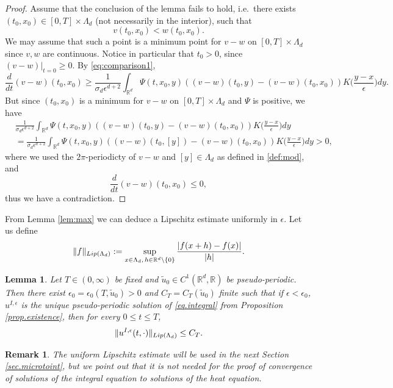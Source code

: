 \documentclass[a4paper,11pt]{amsart}
\newtheorem{lemma}[theorem]{Lemma}
\newtheorem{remark}[theorem]{Remark}
\newcommand{\red}[1]{{#1}}
\newcommand{\R}{\mathbb{R}}
\newcommand{\ep}{\epsilon}
\numberwithin{equation}{section}
\numberwithin{theorem}{section}
\theoremstyle{definition}
\begin{document}
\begin{proof}
Assume that the conclusion of the lemma fails to hold, i.e.~there exists $(t_0,x_0)\in[0,T]\times\Lambda_d$ (not necessarily in the interior), %
such that
\[
v(t_0,x_0)<w(t_0,x_0).
\]
We may assume that such a point is a minimum point for $v-w$ on $[0,T]\times\Lambda_d$ since $v,w$ are continuous. Notice in particular that $t_0>0$, since $(v-w)|_{t=0}\ge 0$. By \eqref{eq:comparison1},
\[
\frac{d}{dt}(v-w)(t_0,x_0)\geq \frac{1}{\sigma_d\ep^{d+2}}\int_{\R^d}\Psi(t, x_0, y)\left((v-w)(t_0,y)-(v-w)(t_0,x_0)\right) K\Big(\frac{y-x}{\ep}\Big)dy.
\]
But since $(t_0,x_0)$ is a minimum for $v-w$ on $[0,T]\times\Lambda_d$ and $\Psi$ is positive, we have
\begin{align*}
&\frac{1}{\sigma_d\ep^{d+2}}\int_{\R^d}\Psi(t, x_0, y)\left((v-w)(t_0,y)-(v-w)(t_0,x_0)\right) K\Big(\frac{y-x}{\ep}\Big)dy\\
&=\frac{1}{\sigma_d\ep^{d+2}}\int_{\R^d}\Psi(t, x_0, y)\left((v-w)(t_0,[y])-(v-w)(t_0,x_0)\right) K\Big(\frac{y-x}{\ep}\Big)dy> 0,
\end{align*}
\red{where we used the $2\pi$-periodicty of $v-w$ and $[y]\in\Lambda_d$ as defined in \eqref{def:mod}, }
and
\[
\frac{d}{dt}(v-w)(t_0,x_0)\le 0,
\]
thus we have a contradiction.
\end{proof}

From Lemma \ref{lem:max} we can deduce a Lipschitz estimate uniformly in $\ep$. Let us define
\[
\red{\|f\|_{\rm Lip(\Lambda_d)}:=\sup_{x\in\Lambda_d,\, h\in\R^d\backslash\{0\}}\frac{|f(x+h)-f(x)|}{|h|}.}
\]


\begin{lemma}\label{lem:lip}
Let $T\in(0,\infty)$ be fixed and \red{$\tilde u_0\in C^1(\R^d,\R)$ be pseudo-periodic}. Then there exist $\ep_0=\ep_0(T,\tilde u_0)>0$ and $C_T=C_T(\tilde u_0)$ finite such that if $\ep<\ep_0$, $u^{I,\ep}$ is the \red{unique pseudo-periodic solution of \eqref{eq.integral} from Proposition \ref{prop.existence},} then for every $0\le t \le T$,
\[
\|u^{I,\ep}(t,\cdot)\|_{\rm Lip(\Lambda_d)}\le C_T.
\]
\end{lemma}
\begin{remark}
The uniform Lipschitz estimate will be used in the next Section \ref{sec.microtoint}, but we point out that it is not needed for the proof of convergence of solutions of the integral equation to solutions of the heat equation. 
\end{remark}
\end{document}
